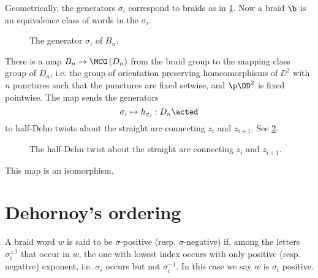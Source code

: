 Geometrically, the generators $\sigma_i$ correspond to braids as in 
\cref{fig:generators}.
Now a braid $\b$ is an equivalence class of words in the $\sigma_i$.

\begin{figure}
\begin{overlay}
\end{overlay}
\caption{The generator $\sigma_i$ of $B_n$.}
\label{fig:generators}
\end{figure}


There is a map $B_n \to \MCG\left(D_n\right)$ from the braid group to the mapping class
group of $D_n$, i.e. the group of orientation preserving homeomorphisms of $\DD^2$ with
$n$ punctures such that the punctures are fixed setwise, and $\p \DD^2$ is fixed
pointwise.
The map sends the generators 
\begin{equation*}
\sigma_i \mapsto h_{\sigma_i}: D_n\acted
\end{equation*}
to half-Dehn twists about the straight arc connecting $z_i$ and $z_{i+1}$.
See \cref{fig:dehn}.

\begin{figure}
\begin{overlay}
\end{overlay}
\caption{The half-Dehn twist about the straight arc connecting $z_i$ and $z_{i+1}$.}
\label{fig:dehn}
\end{figure}

\begin{clm}
This map is an isomorphism.
\end{clm}

\section{Dehornoy's ordering}

\begin{defn}
A braid word $w$ is said to be $\sigma$-positive (resp. $\sigma$-negative) if,
among the letters $\sigma^{\pm 1}_i$ that occur in $w$, the one with lowest index occurs
with only positive (resp. negative) exponent, i.e. $\sigma_i$ occurs but not $\sigma_i^{-1}$.
In this case we say
$w$ is $\sigma_i$ positive.
\end{defn}

